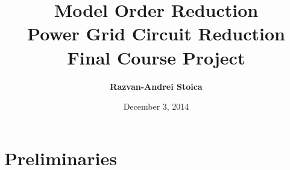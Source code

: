 \documentclass[10pt,a4paper]{article}
\title{\bf Model Order Reduction \\ Power Grid Circuit Reduction \\ Final Course Project}
\author{\bf Razvan-Andrei Stoica}
\date{December 3, 2014}
\begin{document}
\maketitle
\begin{abstract}

\end{abstract}

\section{Preliminaries}
\end{document}
